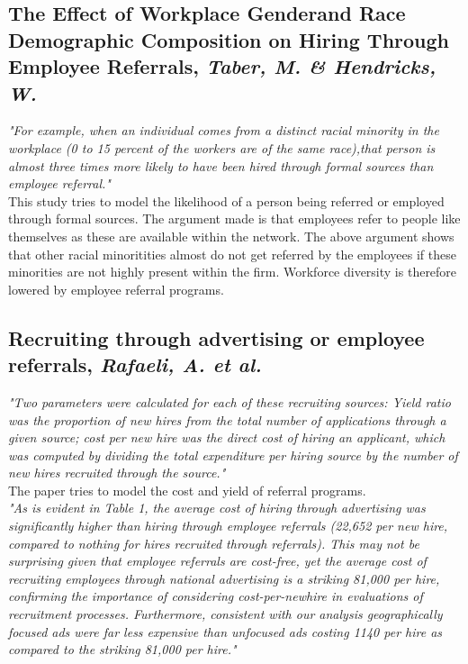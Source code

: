 \documentclass[a4paper, 11pt]{article} %
\begin{document}
\subsection*{The Effect of Workplace Genderand Race Demographic Composition on Hiring Through Employee Referrals, \emph{Taber, M. \& Hendricks, W.} \cite{third}}

\emph{"For example, when an individual comes from a distinct racial
minority in the workplace (0 to 15 percent of the workers are of the same race),that person is almost three times more likely to have been hired through formal sources than employee referral."}\\

This study tries to model the likelihood of a person being referred or employed through formal sources. The argument made is that employees refer to people like themselves as these are available within the network. The above argument shows that other racial minoritities almost do not get referred by the employees if these minorities are not highly present within the firm. Workforce diversity is therefore lowered by employee referral programs.

\subsection*{Recruiting through advertising or employee referrals, \emph{Rafaeli, A. et al.} \cite{fourth}}

\emph{"Two parameters were calculated for each of these recruiting sources: Yield
ratio was the proportion of new hires from the total number of applications
through a given source; cost per new hire was the direct cost of hiring an
applicant, which was computed by dividing the total expenditure per hiring
source by the number of new hires recruited through the source."}\\

The paper tries to model the cost and yield of referral programs.\\

\emph{"As is evident in Table 1, the average cost of hiring through advertising was
significantly higher than hiring through employee referrals (22,652 per new
hire, compared to nothing for hires recruited through referrals). This may
not be surprising given that employee referrals are cost-free, yet the average
cost of recruiting employees through national advertising is a striking
81,000 per hire, confirming the importance of considering cost-per-newhire
in evaluations of recruitment processes. Furthermore, consistent with
our analysis geographically focused ads were far less expensive than
unfocused ads costing 1140 per hire as compared to the striking 81,000 per
hire."}\\
\end{document}
